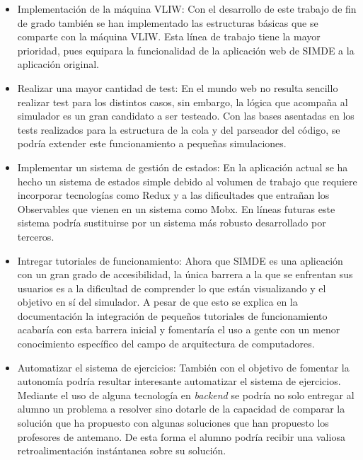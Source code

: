 \begin{itemize}

\item Implementación de la máquina VLIW: Con el desarrollo de este trabajo de fin de grado también se han implementado las estructuras básicas que se comparte con la máquina 
VLIW. Esta línea de trabajo tiene la mayor prioridad, pues equipara la funcionalidad de la aplicación web de 
SIMDE a la aplicación original.

\item Realizar una mayor cantidad de test: En el mundo web no resulta sencillo realizar test 
para los distintos casos, sin embargo, la lógica que acompaña al simulador es un gran candidato a 
ser testeado. Con las bases asentadas en los tests realizados para la estructura de la cola y 
del parseador del código, se podría extender este funcionamiento a pequeñas simulaciones.

\item Implementar un sistema de gestión de estados: En la aplicación actual se ha hecho un sistema
de estados simple debido al volumen de trabajo que requiere incorporar tecnologías
como Redux y a las dificultades que entrañan los Observables que vienen 
en un sistema como Mobx. En líneas futuras este sistema podría sustituirse por un 
sistema más robusto desarrollado por terceros.

\item Intregar tutoriales de funcionamiento: Ahora que SIMDE es una aplicación con un gran
grado de accesibilidad, la única barrera a la que se enfrentan sus usuarios es a la dificultad de
comprender lo que están visualizando y el objetivo en sí del simulador. A pesar de que esto
se explica en la documentación la integración de pequeños tutoriales de funcionamiento acabaría con 
esta barrera inicial y fomentaría el uso a gente con un menor conocimiento específico del campo
de arquitectura de computadores.

\item Automatizar el sistema de ejercicios: También con el objetivo de fomentar la autonomía podría
resultar interesante automatizar el sistema de ejercicios. Mediante el uso de alguna
tecnología en \textit{backend} se podría no solo entregar al alumno un problema a resolver sino 
dotarle de la capacidad de comparar la solución que ha propuesto con algunas soluciones que han 
propuesto los profesores de antemano. De esta forma el alumno podría recibir una valiosa retroalimentación
instántanea sobre su solución.


\end{itemize}
